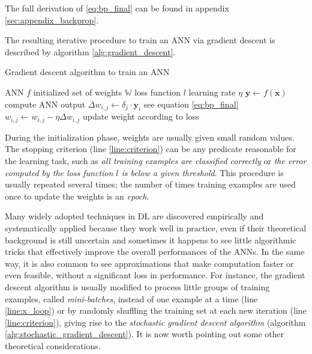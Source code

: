 The full derivation of \eqref{eq:bp_final} can be found in appendix \ref{sec:appendix_backprop}.

The resulting iterative procedure to train an ANN via gradient descent is described by algorithm \ref{alg:gradient_descent}.

\begin{algorithm}
\caption{Gradient descent algorithm to train an ANN}
\label{alg:gradient_descent}
\begin{algorithmic}[1]
\Require ANN $f$
\Require initialized set of weights $\mathbb{W}$
\Require loss function $l$
\Require learning rate $\eta$
 \label{line:criterion}
     \label{line:x_loop}
        \State $\bm{y} \gets f(\bm{x})$
        \Comment compute ANN output
            \State $\Delta w_{i,j} \gets \delta_j \cdot \bm{y}_i$ 
            \Comment see equation \eqref{eq:bp_final} 
            \State $w_{i,j} \gets w_{i,j} - \eta \Delta w_{i,j}$
            \Comment update weight according to loss
        \EndFor
    \EndFor
\EndWhile
\end{algorithmic}
\end{algorithm}

During the initialization phase, weights are usually given small random values. The stopping criterion (line \ref{line:criterion}) can be any predicate reasonable for the learning task, such as \textit{all training examples are classified correctly} or \textit{the error computed by the loss function $l$ is below a given threshold}. This procedure is usually repeated several times; the number of times training examples are used once to update the weights is an \textit{epoch}.

Many widely adopted techniques in DL are discovered empirically and systematically applied because they work well in practice, even if their theoretical background is still uncertain and sometimes it happens to see little algorithmic tricks that effectively improve the overall performances of the ANNs. In the same way, it is also common to see approximations that make computation faster or even feasible, without a significant loss in performance. For instance, the gradient descent algorithm is usually modified to process little groups of training examples, called \textit{mini-batches}, instead of one example at a time (line \ref{line:x_loop}) or by randomly shuffling the training set at each new iteration (line \ref{line:criterion}), giving rise to the \textit{stochastic gradient descent algorithm} (algorithm \ref{alg:stochastic_gradient_descent}). It is now worth pointing out some other theoretical considerations.

